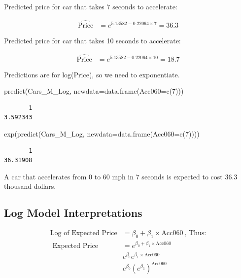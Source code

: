 \documentclass[
  letterpaper,
  DIV=11,
  numbers=noendperiod]{scrreprt}
\newenvironment{Shaded}{\begin{snugshade}}{\end{snugshade}}
\newcommand{\AttributeTok}[1]{\textcolor[rgb]{0.40,0.45,0.13}{#1}}
\newcommand{\DecValTok}[1]{\textcolor[rgb]{0.68,0.00,0.00}{#1}}
\newcommand{\FunctionTok}[1]{\textcolor[rgb]{0.28,0.35,0.67}{#1}}
\newcommand{\NormalTok}[1]{\textcolor[rgb]{0.00,0.23,0.31}{#1}}
\begin{document}
Predicted price for car that takes 7 seconds to accelerate:

\[
\begin{aligned}
\widehat{\text{Price}} & = e^{5.13582-0.22064 \times \text{7}} = 36.3
\end{aligned}
\]

Predicted price for car that takes 10 seconds to accelerate:

\[
\begin{aligned}
\widehat{\text{Price}} & = e^{5.13582-0.22064 \times \text{10}}= 18.7
\end{aligned}
\]

Predictions are for log(Price), so we need to exponentiate.

\begin{Shaded}
\begin{Highlighting}[]
\FunctionTok{predict}\NormalTok{(Cars\_M\_Log, }\AttributeTok{newdata=}\FunctionTok{data.frame}\NormalTok{(}\AttributeTok{Acc060=}\FunctionTok{c}\NormalTok{(}\DecValTok{7}\NormalTok{)))}
\end{Highlighting}
\end{Shaded}

\begin{verbatim}
       1 
3.592343 
\end{verbatim}

\begin{Shaded}
\begin{Highlighting}[]
\FunctionTok{exp}\NormalTok{(}\FunctionTok{predict}\NormalTok{(Cars\_M\_Log, }\AttributeTok{newdata=}\FunctionTok{data.frame}\NormalTok{(}\AttributeTok{Acc060=}\FunctionTok{c}\NormalTok{(}\DecValTok{7}\NormalTok{))))}
\end{Highlighting}
\end{Shaded}

\begin{verbatim}
       1 
36.31908 
\end{verbatim}

A car that accelerates from 0 to 60 mph in 7 seconds is expected to cost
36.3 thousand dollars.

\subsection{Log Model Interpretations}\label{log-model-interpretations}

\[
\begin{aligned}
\text{Log of Expected Price} & = \beta_0 + \beta_1\times \text{Acc060}\  \text{, Thus:} \\
\text{ Expected Price} & = e^{\beta_0 + \beta_1\times \text{Acc060} } \\
 & e^{\beta_0}e^{\beta_1 \times \text{Acc060}} \\
 & e^{\beta_0}(e^{\beta_1})^\text{Acc060}
\end{aligned}
\]
\end{document}
